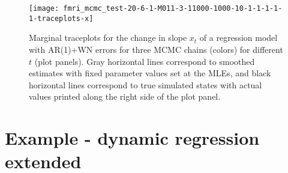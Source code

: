 \documentclass{article}
\begin{document}
\begin{figure}[ht]
\texttt{[image: fmri\_mcmc\_test-20-6-1-M011-3-11000-1000-10-1-1-1-1-1-traceplots-x]}
\caption{Marginal traceplots for the change in slope $x_t$ of a regression model with AR(1)+WN errors for three MCMC chains (colors) for different $t$ (plot panels). Gray horizontal lines correspond to smoothed estimates with fixed parameter values set at the MLEs, and black horizontal lines correspond to true simulated states with actual values printed along the right side of the plot panel.} \label{fig:tracex-arwn}
\end{figure}

%

\clearpage

\section{Example - dynamic regression extended} \label{sec:drext}
\end{document}
